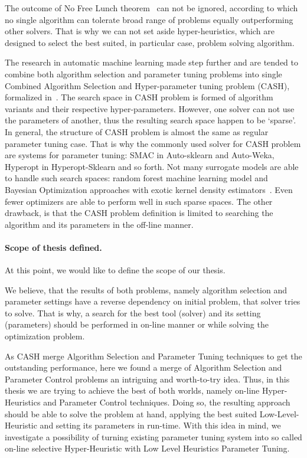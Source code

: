 The outcome of No Free Lunch theorem~\cite{wolpert1997no} can not be ignored, according to which no single algorithm can tolerate broad range of problems equally outperforming other solvers. That is why we can not set aside hyper-heuristics, which are designed to select the best suited, in particular case, problem solving algorithm.

The research in automatic machine learning made step further and are tended to combine both algorithm selection and parameter tuning problems into single Combined Algorithm Selection and Hyper-parameter tuning problem (CASH), formalized in~\cite{thornton2013auto}. The search space in CASH problem is formed of algorithm variants and their respective hyper-parameters. However, one solver can not use the parameters of another, thus the resulting search space happen to be `sparse'. In general, the structure of CASH problem is almost the same as regular parameter tuning case. That is why the commonly used solver for CASH problem are systems for parameter tuning: SMAC in Auto-sklearn and Auto-Weka, Hyperopt in Hyperopt-Sklearn and so forth.
Not many surrogate models are able to handle such search spaces: random forest machine learning model and Bayesian Optimization approaches with exotic kernel density estimators~\cite{levesque2017bayesian}. Even fewer optimizers are able to perform well in such sparse spaces.
The other drawback, is that the CASH problem definition is limited to searching the algorithm and its parameters in the off-line manner.

\paragraph{Scope of thesis defined.}
At this point, we would like to define the scope of our thesis.

We believe, that the results of both problems, namely algorithm selection and parameter settings have a reverse dependency on initial problem, that solver tries to solve.
That is why, a search for the best tool (solver) and its setting (parameters) should be performed in on-line manner or while solving the optimization problem.

As CASH merge Algorithm Selection and Parameter Tuning techniques to get the outstanding performance, here we found a merge of Algorithm Selection and Parameter Control problems an intriguing and worth-to-try idea. 
Thus, in this thesis we are trying to achieve the best of both worlds, namely on-line Hyper-Heuristics and Parameter Control techniques. Doing so, the resulting approach should be able to solve the problem at hand, applying the best suited Low-Level-Heuristic and setting its parameters in run-time. With this idea in mind, we investigate a possibility of turning existing parameter tuning system into so called on-line selective Hyper-Heuristic with Low Level Heuristics Parameter Tuning.
